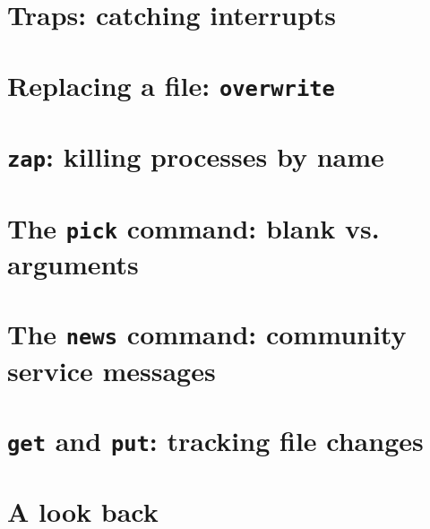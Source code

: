 \section{Traps: catching interrupts}
\section{Replacing a file: \texttt{overwrite}}
\section{\texttt{zap}: killing processes by name}
\section{The \texttt{pick} command: blank vs. arguments}
\section{The \texttt{news} command: community service messages}
\section{\texttt{get} and \texttt{put}: tracking file changes}
\section{A look back}
